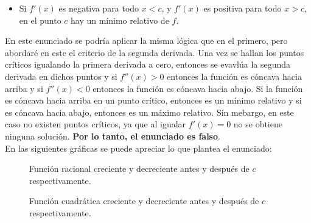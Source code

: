 \begin{itemize}
    \item Si \(f'(x)\) es negativa para todo \(x<c\), y \(f'(x)\) es positiva para todo \(x>c\), en el punto \(c\) hay un mínimo relativo de \(f\).
\end{itemize}

En este enunciado se podría aplicar la misma lógica que en el primero, pero abordaré en este el criterio de la segunda derivada. Una vez se hallan los puntos críticos igualando la primera derivada a cero, entonces se evavlúa la segunda derivada en dichos puntos y si $f''(x) > 0$ entonces la función es cóncava hacia arriba y si $f''(x) < 0$ entonces la función es cóncava hacia abajo. Si la función es cóncava hacia arriba en un punto crítico, entonces es un mínimo relativo y si es cóncava hacia abajo, entonces es un máximo relativo. Sin mebargo, en este caso no existen puntos críticos, ya que al igualar $f'(x) = 0$ no se obtiene ninguna solución. \textbf{Por lo tanto, el enunciado es falso}. \\
En las siguientes gráficas se puede apreciar lo que plantea el enunciado:

\begin{figure}[H]
    \centering
    
    \caption{Función racional creciente y decreciente antes y después de $c$ respectivamente.}
    \label{fig:racional2}
\end{figure}

\begin{figure}[H]
    \centering
    
    \caption{Función cuadrática creciente y decreciente antes y después de $c$ respectivamente.}
    \label{fig:cuadratica2}
\end{figure}